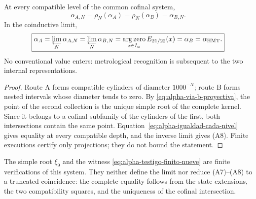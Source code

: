 \begin{theorem}
\label{prop:alpha-dos-limites-historico-rev04}
At every compatible level of the common cofinal system,
\begingroup
\renewcommand{\theequation}{A7}
\begin{equation}
 \boxed{\alpha_{A,N}=\rho_N(\alpha_A)
 =\rho_N(\alpha_B)=\alpha_{B,N}.}
 \label{eq:alpha-dos-vias-cada-nivel-historico-rev04}
\end{equation}
\endgroup
In the coinductive limit,
\begingroup
\renewcommand{\theequation}{A8}
\begin{equation}
 \boxed{\alpha_A
 =\varprojlim_N\alpha_{A,N}
 =\varprojlim_N\alpha_{B,N}
 =\operatorname*{arg\,zero}_{x\in I_\alpha}E_{21/22}(x)
 =\alpha_B=\alpha_{\mathrm{HMT}}.}
 \label{eq:alpha-dos-vias-limite-coinductivo-historico-rev04}
\end{equation}
\endgroup
No conventional value enters: metrological recognition is subsequent to the
two internal representations.
\end{theorem}

\begin{proof}
Route A forms compatible cylinders of diameter \(1000^{-N}\); route B forms
nested intervals whose diameter tends to zero. By
\eqref{eq:alpha-via-b-proyectiva}, the point of the second collection is the
unique simple root of the complete kernel. Since it belongs to a cofinal
subfamily of the cylinders of the first, both intersections contain the same
point. Equation~\eqref{eq:alpha-igualdad-cada-nivel} gives equality at every
compatible depth, and the inverse limit gives (A8). Finite executions certify
only projections; they do not bound the statement.
\end{proof}

The simple root \(\xi_9\) and the witness
\eqref{eq:alpha-testigo-finito-nueve} are finite verifications of this
system. They neither define the limit nor reduce (A7)--(A8) to a truncated
coincidence: the complete equality follows from the state extensions, the two
compatibility squares, and the uniqueness of the cofinal intersection.
